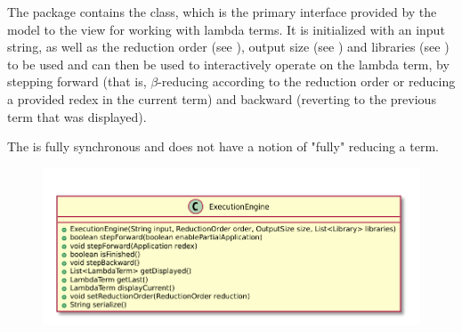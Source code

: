 The \texttt{} package contains the \texttt{}
class, which is the primary interface provided by the model to the view for working
with lambda terms. It is initialized with an input string, as well as the reduction
order (see \texttt{}), output size (see \texttt{})
and libraries (see \texttt{}) to be used and can then be used to
interactively operate on the lambda term, by stepping forward (that is, $\beta$-reducing
according to the reduction order or reducing a provided redex in the current term)
and backward (reverting to the previous term that was displayed).

The \texttt{} is fully synchronous and does not have a notion
of "fully" reducing a term.

\begin{figure}[H]
	\centering
	\includegraphics[width=\textwidth]{packageDiagrams/modelPackage}
\end{figure}
